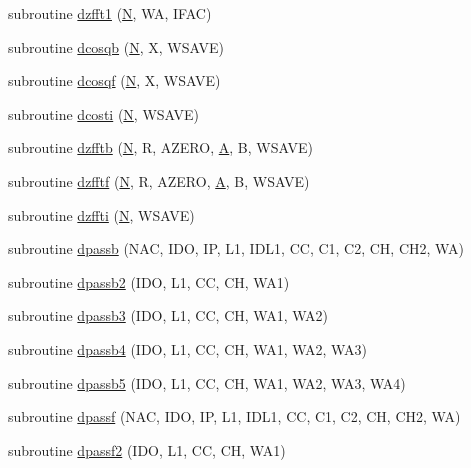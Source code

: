 \begin{DoxyCompactItemize}
\item 
subroutine \hyperlink{dfft_8f_a90aebdebb1c7187c03638c6f19443110}{dzfft1} (\hyperlink{polmisc_8c_a0240ac851181b84ac374872dc5434ee4}{N}, W\+A, I\+F\+A\+C)
\item 
subroutine \hyperlink{dfft_8f_a4f2536cb7f40de6df80514e1cad2678f}{dcosqb} (\hyperlink{polmisc_8c_a0240ac851181b84ac374872dc5434ee4}{N}, X, W\+S\+A\+V\+E)
\item 
subroutine \hyperlink{dfft_8f_a888158c144da9b2443d1626fee9d4c3a}{dcosqf} (\hyperlink{polmisc_8c_a0240ac851181b84ac374872dc5434ee4}{N}, X, W\+S\+A\+V\+E)
\item 
subroutine \hyperlink{dfft_8f_ae0d9dd1dfaf58c041ca8c12bcbd81dd0}{dcosti} (\hyperlink{polmisc_8c_a0240ac851181b84ac374872dc5434ee4}{N}, W\+S\+A\+V\+E)
\item 
subroutine \hyperlink{dfft_8f_a25751e757e01926f605c137545c04dd6}{dzfftb} (\hyperlink{polmisc_8c_a0240ac851181b84ac374872dc5434ee4}{N}, R, A\+Z\+E\+R\+O, \hyperlink{classA}{A}, B, W\+S\+A\+V\+E)
\item 
subroutine \hyperlink{dfft_8f_ac015ffc48456f7d9786775355cf3e536}{dzfftf} (\hyperlink{polmisc_8c_a0240ac851181b84ac374872dc5434ee4}{N}, R, A\+Z\+E\+R\+O, \hyperlink{classA}{A}, B, W\+S\+A\+V\+E)
\item 
subroutine \hyperlink{dfft_8f_a9f4c446e83c3bbc673e451aaab7e960c}{dzffti} (\hyperlink{polmisc_8c_a0240ac851181b84ac374872dc5434ee4}{N}, W\+S\+A\+V\+E)
\item 
subroutine \hyperlink{dfft_8f_abd8cfee65d3b5823091e39a826f9ca7d}{dpassb} (N\+A\+C, I\+D\+O, I\+P, L1, I\+D\+L1, C\+C, C1, C2, C\+H, C\+H2, W\+A)
\item 
subroutine \hyperlink{dfft_8f_aa6cbe100966bd2d370be4739c8586006}{dpassb2} (I\+D\+O, L1, C\+C, C\+H, W\+A1)
\item 
subroutine \hyperlink{dfft_8f_a6cc5e5b8675ed44769f851b0ab830557}{dpassb3} (I\+D\+O, L1, C\+C, C\+H, W\+A1, W\+A2)
\item 
subroutine \hyperlink{dfft_8f_a78a5fca1f23c6c8ce3a3efee56506a7d}{dpassb4} (I\+D\+O, L1, C\+C, C\+H, W\+A1, W\+A2, W\+A3)
\item 
subroutine \hyperlink{dfft_8f_a7797be856880c746f6acee47856b45a7}{dpassb5} (I\+D\+O, L1, C\+C, C\+H, W\+A1, W\+A2, W\+A3, W\+A4)
\item 
subroutine \hyperlink{dfft_8f_a8ad230fb964ec6efff944ace88a68240}{dpassf} (N\+A\+C, I\+D\+O, I\+P, L1, I\+D\+L1, C\+C, C1, C2, C\+H, C\+H2, W\+A)
\item 
subroutine \hyperlink{dfft_8f_a13d884b1311f1edfbb6e71e172d0ba26}{dpassf2} (I\+D\+O, L1, C\+C, C\+H, W\+A1)

\end{DoxyCompactItemize}
